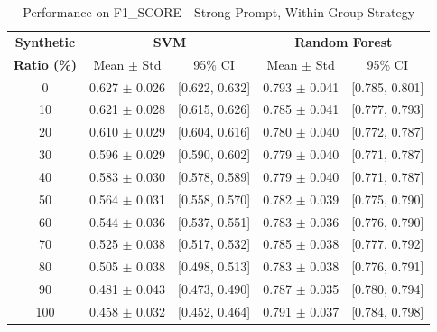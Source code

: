 \begin{table}[h]
\centering
\caption{Performance on F1_SCORE - Strong Prompt, Within Group Strategy}
\label{tab:strong_within_group_f1_score}
\begin{tabular}{c|cc|cc}
\hline
\textbf{Synthetic} & \multicolumn{2}{c|}{\textbf{SVM}} & \multicolumn{2}{c}{\textbf{Random Forest}} \\
\textbf{Ratio (\%)} & Mean $\pm$ Std & 95\% CI & Mean $\pm$ Std & 95\% CI \\
\hline
0 & 0.627 $\pm$ 0.026 & [0.622, 0.632] & 0.793 $\pm$ 0.041 & [0.785, 0.801] \\
10 & 0.621 $\pm$ 0.028 & [0.615, 0.626] & 0.785 $\pm$ 0.041 & [0.777, 0.793] \\
20 & 0.610 $\pm$ 0.029 & [0.604, 0.616] & 0.780 $\pm$ 0.040 & [0.772, 0.787] \\
30 & 0.596 $\pm$ 0.029 & [0.590, 0.602] & 0.779 $\pm$ 0.040 & [0.771, 0.787] \\
40 & 0.583 $\pm$ 0.030 & [0.578, 0.589] & 0.779 $\pm$ 0.040 & [0.771, 0.787] \\
50 & 0.564 $\pm$ 0.031 & [0.558, 0.570] & 0.782 $\pm$ 0.039 & [0.775, 0.790] \\
60 & 0.544 $\pm$ 0.036 & [0.537, 0.551] & 0.783 $\pm$ 0.036 & [0.776, 0.790] \\
70 & 0.525 $\pm$ 0.038 & [0.517, 0.532] & 0.785 $\pm$ 0.038 & [0.777, 0.792] \\
80 & 0.505 $\pm$ 0.038 & [0.498, 0.513] & 0.783 $\pm$ 0.038 & [0.776, 0.791] \\
90 & 0.481 $\pm$ 0.043 & [0.473, 0.490] & 0.787 $\pm$ 0.035 & [0.780, 0.794] \\
100 & 0.458 $\pm$ 0.032 & [0.452, 0.464] & 0.791 $\pm$ 0.037 & [0.784, 0.798] \\
\hline
\end{tabular}
\end{table}